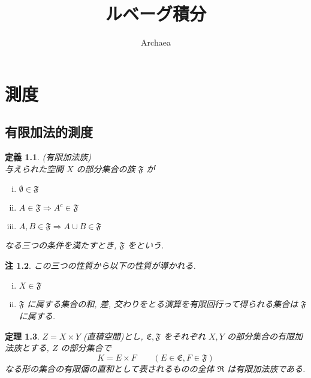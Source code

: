 \documentclass[dvipdfmx]{jsreport}
\newtheorem{theo}{定理}[section]
\newtheorem{defi}[theo]{定義}
\newtheorem{rema}[theo]{注}
\begin{document}
\title{ルベーグ積分}
\author{Archaea}
\maketitle

\chapter{測度}

\section{有限加法的測度}

\begin{defi}
    (有限加法族) \\
    与えられた空間 $X$ の部分集合の族 $\mathfrak{F}$ が
    \begin{enumerate}[(i)]
        \item $\emptyset \in \mathfrak{F}$
        \item $A \in \mathfrak{F} \Rightarrow A^c \in \mathfrak{F}$
        \item $A, B \in \mathfrak{F} \Rightarrow A \cup B \in \mathfrak{F}$
    \end{enumerate}
    なる三つの条件を満たすとき, $\mathfrak{F}$ をという. 
\end{defi}
\begin{rema}
    この三つの性質から以下の性質が導かれる. 
    \begin{enumerate}[(i)]
        \item $X \in \mathfrak{F}$
        \item $\mathfrak{F}$ に属する集合の和, 差, 交わりをとる演算を有限回行って得られる集合は $\mathfrak{F}$ に属する. 
    \end{enumerate}
\end{rema}

\begin{theo}
    $Z = X \times Y$ (直積空間)とし, $\mathfrak{E}, \mathfrak{F}$ をそれぞれ $X, Y$ の部分集合の有限加法族とする, $Z$ の部分集合で
    \begin{equation}
        K = E \times F \qquad (E \in \mathfrak{E}, F \in \mathfrak{F})
    \end{equation}
    なる形の集合の有限個の直和として表されるものの全体 $\mathfrak{R}$ は有限加法族である. 
\end{theo}
\end{document}
